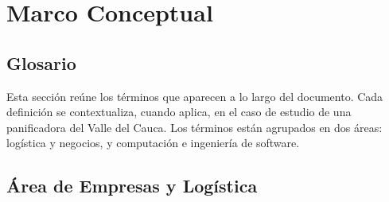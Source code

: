 
\section{Marco Conceptual}

\subsection{Glosario}

Esta sección reúne los términos que aparecen a lo largo del documento. Cada definición se contextualiza, cuando aplica, en el caso de estudio de una panificadora del Valle del Cauca. Los términos están agrupados en dos áreas: logística y negocios, y computación e ingeniería de software.

\subsection*{Área de Empresas y Logística}

